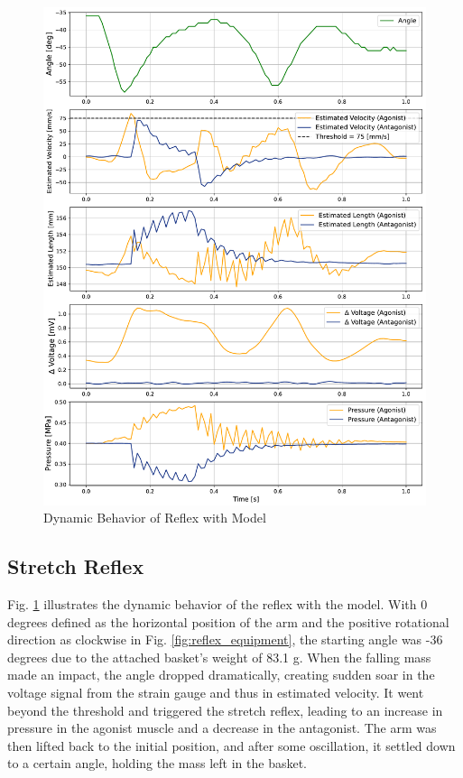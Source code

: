 \begin{figure}[t]
\begin{minipage}[H]{\textwidth}
\begin{minipage}[H]{0.48\textwidth}
            \includegraphics[width=\columnwidth]{fig/20240819_r20_reflex_all_plt.pdf}
            \caption{Dynamic Behavior of Reflex with Model}
            \label{fig:reflex_all}
            \setcounter{figure}{7}  
            \renewcommand{\thefigure}{\arabic{figure}} 
        \end{minipage}
    \end{minipage}
\end{figure}

\subsection{Stretch Reflex}
Fig. \ref{fig:reflex_all} illustrates the dynamic behavior of the reflex with the model. With 0 degrees defined as the horizontal position of the arm and the positive rotational direction as clockwise in Fig. \ref{fig:reflex_equipment}, the starting angle was -36 degrees due to the attached basket's weight of 83.1 g. When the falling mass made an impact, the angle dropped dramatically, creating sudden soar in the voltage signal from the strain gauge and thus in estimated velocity. It went beyond the threshold and triggered the stretch reflex, leading to an increase in pressure in the agonist muscle and a decrease in the antagonist. The arm was then lifted back to the initial position, and after some oscillation, it settled down to a certain angle, holding the mass left in the basket.

